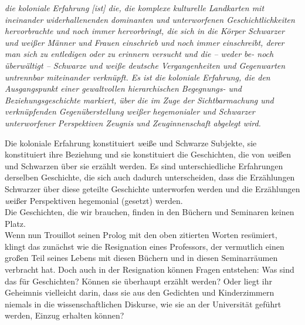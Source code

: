 \begin{myenv}
  \textit{\glqq[…] die koloniale Erfahrung [ist] die, die komplexe kulturelle
    Landkarten mit ineinander widerhallenenden dominanten und unterworfenen
    Geschichtlichkeiten hervorbrachte und noch immer hervorbringt, die sich in
    die Körper Schwarzer und weißer Männer und Frauen einschrieb und noch immer
    einschreibt, derer man sich zu entledigen oder zu erinnern versucht und die
    – weder be- noch überwältigt – Schwarze und weiße deutsche Vergangenheiten
    und Gegenwarten untrennbar miteinander verknüpft. Es ist die koloniale
    Erfahrung, die den Ausgangspunkt einer gewaltvollen hierarchischen
    Begegnungs- und Beziehungsgeschichte markiert, über die im Zuge der
    Sichtbarmachung und verknüpfenden Gegenüberstellung weißer hegemonialer und
    Schwarzer unterworfener Perspektiven Zeugnis und Zeuginnenschaft abgelegt
  wird.\grqq\footnotemark{}} \end{myenv}
Die koloniale Erfahrung konstituiert \textit{w}eiße und Schwarze Subjekte, sie
konstituiert ihre Beziehung und sie konstituiert die Geschichten, die von
\textit{w}eißen und Schwarzen über sie erzählt werden. Es sind unterschiedliche
Erfahrungen derselben Geschichte, die sich auch dadurch unterscheiden, dass die
Erzählungen Schwarzer über diese geteilte Geschichte unterworfen werden und die
Erzählungen \textit{w}eißer Perspektiven hegemonial (gesetzt) werden.\\
Die Geschichten, die wir brauchen, finden in den Büchern und Seminaren keinen
Platz.\\

Wenn nun Trouillot seinen Prolog mit den oben zitierten Worten resümiert,
klingt das zunächst wie die Resignation eines Professors, der vermutlich einen
großen Teil seines Lebens mit diesen Büchern und in diesen Seminarräumen
verbracht hat. Doch auch in der Resignation können Fragen entstehen: Was sind
das für Geschichten? Können sie überhaupt erzählt werden? Oder liegt ihr
Geheimnis vielleicht darin, dass sie aus den Gedichten und Kinderzimmern
niemals in die wissenschaftlichen Diskurse, wie sie an der Universität geführt
werden, Einzug erhalten können?\\

